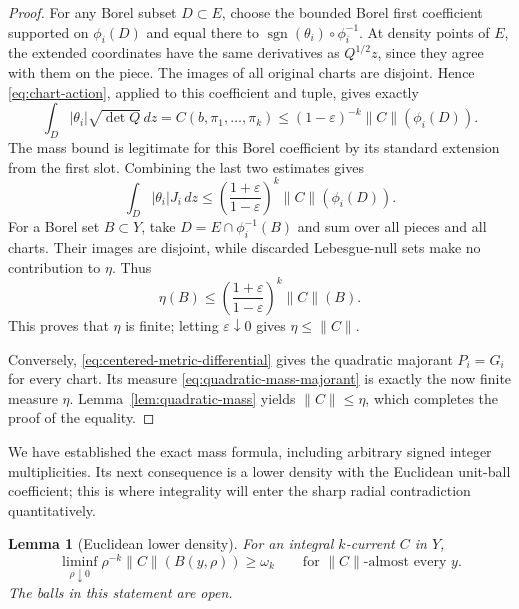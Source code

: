 \documentclass[11pt]{article}
\numberwithin{equation}{section}
\newtheorem{lemma}[theorem]{Lemma}
\theoremstyle{definition}
\theoremstyle{remark}
\begin{document}
\begin{proof}
For any Borel subset \(D\subset E\), choose the bounded Borel first
coefficient supported on \(\phi_i(D)\) and equal there to
\(\operatorname{sgn}(\theta_i)\circ\phi_i^{-1}\). At density points of \(E\), the
extended coordinates have the same derivatives as \(Q^{1/2}z\), since
they agree with them on the piece. The images of all original charts
are disjoint. Hence \eqref{eq:chart-action}, applied to this coefficient
and tuple, gives exactly
\[
 \int_D|\theta_i|\sqrt{\det Q}\,d z
 = C(b,\pi_1,\ldots,\pi_k)
 \le(1-\varepsilon)^{-k}\|C\|(\phi_i(D)).
\]
The mass bound is legitimate for this Borel coefficient by its standard
extension from the first slot. Combining the last two estimates gives
\[
 \int_D|\theta_i|J_i\,d z
 \le\left(\frac{1+\varepsilon}{1-\varepsilon}\right)^k
       \|C\|(\phi_i(D)).
\]
For a Borel set \(B\subset Y\), take
\(D=E\cap\phi_i^{-1}(B)\) and sum over all pieces and all charts.
Their images are disjoint, while discarded Lebesgue-null sets make no
contribution to \(\eta\). Thus
\[
 \eta(B)\le
 \left(\frac{1+\varepsilon}{1-\varepsilon}\right)^k\|C\|(B).
\]
This proves that \(\eta\) is finite; letting
\(\varepsilon\downarrow0\) gives \(\eta\le\|C\|\).

Conversely, \eqref{eq:centered-metric-differential} gives the quadratic
majorant \(P_i=G_i\) for every chart. Its measure
\eqref{eq:quadratic-mass-majorant} is exactly the now finite measure
\(\eta\). Lemma~\ref{lem:quadratic-mass} yields \(\|C\|\le\eta\),
which completes the proof of the equality.
\end{proof}

We have established the exact mass formula, including arbitrary signed
integer multiplicities. Its next consequence is a lower density with
the Euclidean unit-ball coefficient; this is where integrality will
enter the sharp radial contradiction quantitatively.

\begin{lemma}[Euclidean lower density]
\label{lem:euclidean-density}
For an integral \(k\)-current \(C\) in \(Y\),
\begin{equation}
\label{eq:euclidean-lower-density}
 \liminf_{\rho\downarrow0}
       \rho^{-k}\|C\|(B(y,\rho))\ge\omega_k
 \qquad\text{for }\|C\|\text{-almost every }y.
\end{equation}
The balls in this statement are open.
\end{lemma}
\end{document}
